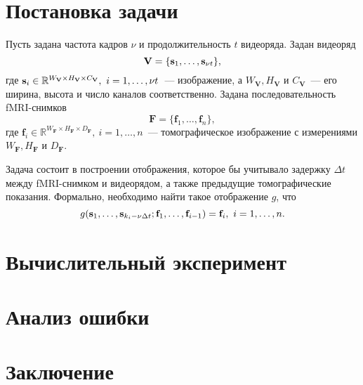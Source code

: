 \documentclass[a4paper, 12pt]{article}
\begin{document}
\section{Постановка задачи}

	Пусть задана частота кадров $\nu$ и продолжительность $t$ видеоряда. 
	Задан видеоряд
	\begin{equation}
		\mathbf{V} = \{\mathbf{s}_1, \ldots, \mathbf{s}_{\nu t}\},
	\end{equation}
	где $\mathbf{s}_i \in \mathbb{R}^{W_{\mathbf{V}} \times H_{\mathbf{V}} \times C_{\mathbf{V}}},
	\ i = 1, \ldots, \nu t$~--- изображение, а $W_{\mathbf{V}}, H_{\mathbf{V}}$ и 
	$C_{\mathbf{V}}$~--- его ширина, высота и число каналов соответственно.
	Задана последовательность fMRI-снимков
	\begin{equation}
		\mathbf{F} = \{\mathbf{f}_1, \ldots, \mathbf{f}_n\},
	\end{equation}
	где $\mathbf{f}_i \in \mathbb{R}^{W_{\mathbf{F}} \times H_{\mathbf{F}} \times D_{\mathbf{F}}},
	\ i = 1, \ldots, n$~--- томографическое изображение с измерениями
	$W_{\mathbf{F}}, H_{\mathbf{F}}$ и $D_{\mathbf{F}}$. 

	Задача состоит в построении отображения, которое бы учитывало задержку $\Delta t$ между
	fMRI-снимком и видеорядом, а также предыдущие томографические показания. Формально, необходимо
	найти такое отображение $g$, что
	\begin{equation}
		g(\mathbf{s}_1, \ldots, \mathbf{s}_{k_i - \nu \Delta t}; \mathbf{f}_1, \ldots, \mathbf{f}_{i-1}) = \mathbf{f}_i,
		\ i = 1, \ldots, n.
	\end{equation}

\section{Вычислительный эксперимент}

\section{Анализ ошибки}

\section{Заключение}



\end{document}
